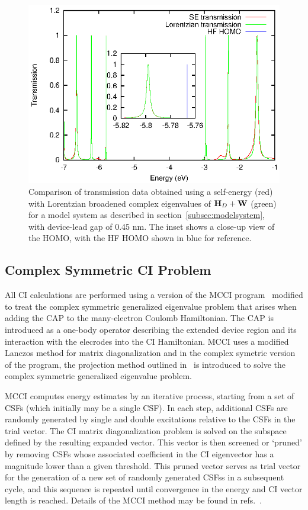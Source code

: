 \begin{figure} 
	\begin{center}
		\includegraphics[width=0.9\linewidth]{figures/figure3}
	\end{center}
	\caption{Comparison of transmission data obtained using a self-energy
	(red) with Lorentzian broadened complex eigenvalues of $\mathbf{H}_D + \mathbf{W}$
	(green) for a model system as described in
	section~\ref{subsec:modelsystem}, with device-lead gap of 0.45 nm.
	The inset shows a close-up view of the \ac{HOMO}, with the HF \ac{HOMO}
	shown in blue for reference.
	}
	\label{fig:13evals}
\end{figure}

\subsection{Complex Symmetric \ac{CI} Problem}

All \ac{CI} calculations  are performed using a version of the \ac{MCCI}
program~\cite{mcci1995, mcci1998} modified to treat the complex
symmetric generalized eigenvalue problem that arises when adding the
\ac{CAP} to the many-electron Coulomb Hamiltonian. The \ac{CAP} is
introduced as a one-body operator describing the extended device region 
and its interaction with the elecrodes into the \ac{CI} Hamiltonian. 
\ac{MCCI} uses a modified Lanczos method for matrix diagonalization and
in the complex symetric version of the program, the projection method
outlined in~\cite{tarantelli_csd} is introduced to solve the complex
symmetric generalized eigenvalue problem. 

\ac{MCCI} computes energy estimates by an iterative process, starting from
a set of \acp{CSF} (which initially may be a single \ac{CSF}). In each step,
additional \acp{CSF} are randomly generated by single and double excitations
relative to the \acp{CSF} in the trial vector. The \ac{CI} matrix
diagonalization problem is solved on the subspace defined by the resulting
expanded vector. This vector is then screened or `pruned' by removing
\acp{CSF} whose associated coefficient in the \ac{CI} eigenvector has a
magnitude lower than a given threshold. This pruned vector serves as
trial vector for the generation of a new set of randomly generated
\acp{CSF}s in a subsequent cycle, and  this sequence is repeated until
convergence in the energy and CI vector length is reached. Details of the
\ac{MCCI} method may be found in 
refs.~\cite{mcci1995,mcci1998,mcci2000,multiref}.

